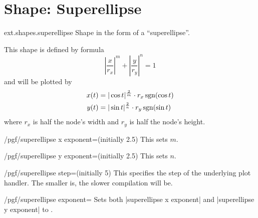 %
%
%
\section{Shape: Superellipse}
\begin{pgflibrary}{ext.shapes.superellipse}
  Shape in the form of a ``superellipse''.
\end{pgflibrary}

This shape is defined by formula
\begin{equation*}
  \left|\frac x{r_x}\right|^m + \left|\frac y{r_y}\right|^n = 1
\end{equation*}
and will be plotted by
\begin{align*}
  x(t) &= |\cos t|^{\frac 2m} \cdot r_x \operatorname{sgn}(\cos t) \\
  y(t) &= |\sin t|^{\frac 2n} \cdot r_y \operatorname{sgn}(\sin t) \\
\end{align*}
where $r_x$ is half the node's width and $r_y$ is half the node's height.

\begin{key}{/pgf/superellipse x exponent=(initially 2.5)}
This sets $m$.
\end{key}
\begin{key}{/pgf/superellipse y exponent=(initially 2.5)}
This sets $n$.
\end{key}
\begin{key}{/pgf/superellipse step=(initially 5)}
This specifies the step of the underlying plot handler. The smaller  is, the slower compilation will be.
\end{key}
\begin{key}{/pgf/superellipse exponent=}
  Sets both |superellipse x exponent| and |superellipse y exponent| to .
\end{key}
\begin{codeexample}[preamble=\usetikzlibrary{ext.shapes.superellipse}]
\end{codeexample}

\endinput